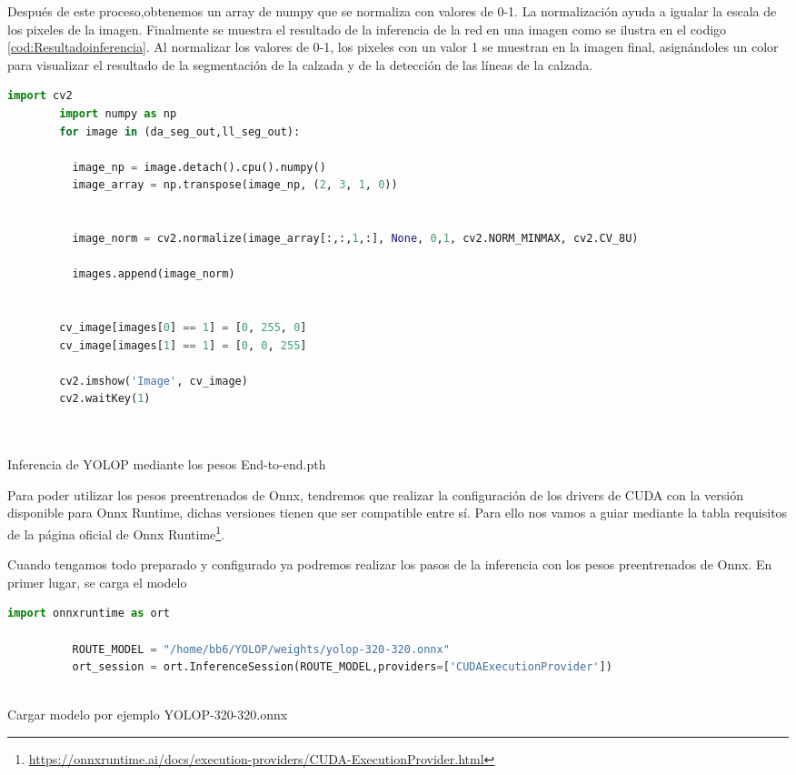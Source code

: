     Después de este proceso,obtenemos un array de numpy que se normaliza con valores de 0-1. La normalización 
    ayuda a igualar la escala de los pixeles de la imagen. Finalmente se muestra el resultado de la inferencia de la red 
    en una imagen como se ilustra en el codigo \ref{cod:Resultadoinferencia}. Al normalizar los valores de 0-1, los pixeles con un valor 1 se muestran en la imagen final, asignándoles un color
    para visualizar el resultado de la segmentación de la calzada y de la detección de las líneas de la calzada. \newline
    \newpage
    \begin{code}[h]
      \begin{lstlisting}[language=Python]
        import cv2
        import numpy as np
        for image in (da_seg_out,ll_seg_out):

          image_np = image.detach().cpu().numpy()
          image_array = np.transpose(image_np, (2, 3, 1, 0))

        
          image_norm = cv2.normalize(image_array[:,:,1,:], None, 0,1, cv2.NORM_MINMAX, cv2.CV_8U)

          images.append(image_norm)

    
        cv_image[images[0] == 1] = [0, 255, 0]
        cv_image[images[1] == 1] = [0, 0, 255]

        cv2.imshow('Image', cv_image)
        cv2.waitKey(1)

    
      \end{lstlisting}
      \caption[Resultado de la inferencia del modelo YOLOP]{Inferencia de YOLOP mediante los pesos End-to-end.pth}
      \label{cod:Resultadoinferencia}
      \end{code}  

      Para poder utilizar los pesos preentrenados de Onnx, tendremos que realizar la configuración de los drivers de CUDA con la versión disponible para Onnx Runtime, 
      dichas versiones tienen que ser compatible entre sí. Para ello nos vamos a guiar mediante la tabla requisitos de la página oficial de Onnx Runtime\footnote{\url{https://onnxruntime.ai/docs/execution-providers/CUDA-ExecutionProvider.html}}. \newline

      Cuando tengamos todo preparado y configurado ya podremos realizar los pasos de la inferencia con los pesos preentrenados de Onnx. En primer lugar, se carga el modelo
      
      \begin{code}[h]
        \begin{lstlisting}[language=Python]
          import onnxruntime as ort

          ROUTE_MODEL = "/home/bb6/YOLOP/weights/yolop-320-320.onnx"
          ort_session = ort.InferenceSession(ROUTE_MODEL,providers=['CUDAExecutionProvider'])
      
        \end{lstlisting}
        \caption[Cargar modelo]{Cargar modelo por ejemplo YOLOP-320-320.onnx}
        \label{yolop320}
        \end{code}  

